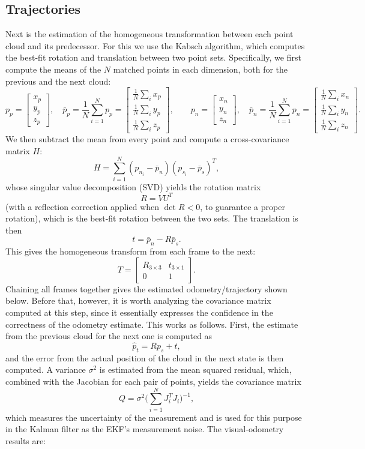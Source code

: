 \documentclass[11pt]{article}
\begin{document}
\subsection{Trajectories}
Next is the estimation of the homogeneous transformation between each point cloud and its predecessor.
For this we use the Kabsch algorithm, which computes the best-fit rotation and translation between two
point sets. Specifically, we first compute the means of the $N$ matched points in each dimension, both
for the previous and the next cloud:
\[
p_p = \begin{bmatrix}x_p\\y_p\\z_p\end{bmatrix}, \quad
\bar p_p = \frac1N\sum_{i=1}^N p_p =
\begin{bmatrix}\frac1N\sum_i x_p\\ \frac1N\sum_i y_p\\ \frac1N\sum_i z_p\end{bmatrix},
\qquad
p_n = \begin{bmatrix}x_n\\y_n\\z_n\end{bmatrix}, \quad
\bar p_n = \frac1N\sum_{i=1}^N p_n =
\begin{bmatrix}\frac1N\sum_i x_n\\ \frac1N\sum_i y_n\\ \frac1N\sum_i z_n\end{bmatrix}.
\]
We then subtract the mean from every point and compute a cross-covariance matrix $H$:
\[
H = \sum_{i=1}^N (p_{n_i}-\bar p_n)(p_{s_i}-\bar p_s)^T,
\]
whose singular value decomposition (SVD) yields the rotation matrix
\[
R = VU^T
\]
(with a reflection correction applied when $\det R < 0$, to guarantee a proper rotation),
which is the best-fit rotation between the two sets. The translation is then
\[
t = \bar p_n - R\bar p_s.
\]
This gives the homogeneous transform from each frame to the next:
\[
T = \begin{bmatrix} R_{3\times 3} & t_{3\times 1} \\ 0 & 1 \end{bmatrix}.
\]
Chaining all frames together gives the estimated odometry/trajectory shown below. Before that,
however, it is worth analyzing the covariance matrix computed at this step, since it essentially
expresses the confidence in the correctness of the odometry estimate. This works as follows. First, the
estimate from the previous cloud for the next one is computed as
\[
\hat p_t = R p_s + t,
\]
and the error from the actual position of the cloud in the next state is then computed. A variance
$\sigma^2$ is estimated from the mean squared residual, which, combined with the Jacobian for each pair
of points, yields the covariance matrix
\[
Q = \sigma^2\Big(\sum_{i=1}^N J_i^T J_i\Big)^{-1},
\]
which measures the uncertainty of the measurement and is used for this purpose in the Kalman filter as
the EKF's measurement noise. The visual-odometry results are:
\end{document}
